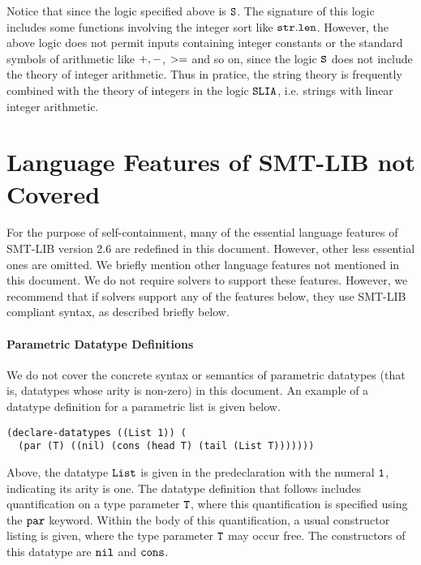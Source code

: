 \documentclass[english,a4paper,10pt]{article}
\begin{document}
\begin{appendix}
Notice that since the logic specified above is ${\tt S}$.
The signature of this logic includes 
some functions involving the integer sort like
${\tt str.len}$.
However, the above logic does not permit inputs containing
integer constants or the standard symbols of arithmetic like 
${\tt +}, {\tt -}$, ${\tt >=}$ and so on, since the logic ${\tt S}$
does not include the theory of integer arithmetic.
Thus in pratice, 
the string theory is frequently combined with the theory of integers
in the logic ${\tt SLIA}$, i.e. strings with linear integer arithmetic.

\section{Language Features of SMT-LIB not Covered}%
\label{apx:not-covered}

For the purpose of self-containment,
many of the essential language features of SMT-LIB version 2.6
are redefined in this document.
However, other less essential ones are omitted.
We briefly mention other language features not mentioned in
this document.
We do not require solvers to support these features.
However, we recommend that if solvers support any of the features below,
they use SMT-LIB compliant syntax, as described briefly below.

\paragraph{Parametric Datatype Definitions}
We do not cover the concrete syntax or semantics of parametric datatypes (that
is, datatypes whose arity is non-zero) in this document.
An example of a datatype definition for a parametric list is given below.
\begin{lstlisting}
(declare-datatypes ((List 1)) (
  (par (T) ((nil) (cons (head T) (tail (List T)))))))
\end{lstlisting}
Above, the datatype ${\tt List}$ 
is given in the predeclaration with the numeral ${\tt 1}$, indicating
its arity is one.
The datatype definition that follows includes quantification on a type
parameter ${\tt T}$, where this quantification is specified using the 
${\tt par}$ keyword. Within the body of this quantification,
a usual constructor listing is given, where the type parameter ${\tt T}$
may occur free. The constructors of this datatype are ${\tt nil}$
and ${\tt cons}$.


\end{appendix}
\end{document}
